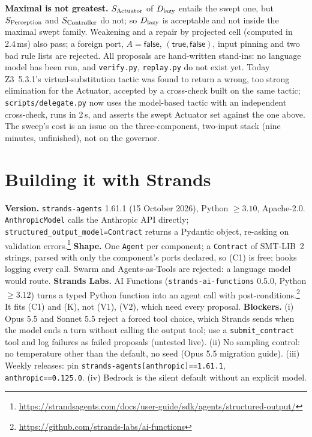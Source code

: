 \documentclass[10pt]{article}
\theoremstyle{tplain}\newtheorem{theorem}{Theorem}\newtheorem{lemma}[theorem]{Lemma}\newtheorem{proposition}[theorem]{Proposition}\newtheorem{corollary}[theorem]{Corollary}\newtheorem{claim}[theorem]{Claim}
\theoremstyle{tdef}\newtheorem{definition}[theorem]{Definition}
\newcommand{\TRUE}{\mathsf{true}}\newcommand{\FALSE}{\mathsf{false}}
\begin{document}
\textbf{Maximal is not greatest.} $S_{\rm Actuator}$ of $D_{\rm lazy}$ entails the swept one, but $S_{\rm Perception}$ and $S_{\rm Controller}$ do not; so $D_{\rm lazy}$ is acceptable and not inside the maximal swept family. Weakening and a repair by projected cell (computed in 2.4\,ms) also pass; a foreign port, $A=\FALSE$, $(\TRUE,\FALSE)$, input pinning and two bad rule lists are rejected. All proposals are hand-written stand-ins: no language model has been run, and \texttt{verify.py}, \texttt{replay.py} do not exist yet. Today Z3~5.3.1's virtual-substitution tactic was found to return a wrong, too strong elimination for the Actuator, accepted by a cross-check built on the same tactic; \texttt{scripts/delegate.py} now uses the model-based tactic with an independent cross-check, runs in 2\,s, and asserts the swept Actuator set against the one above. The sweep's cost is an issue on the three-component, two-input stack (nine minutes, unfinished), not on the governor.

\section{Building it with Strands}
\textbf{Version.} \texttt{strands-agents} 1.61.1 (15 October 2026), Python $\ge3.10$, Apache-2.0. \texttt{AnthropicModel} calls the Anthropic API directly; \texttt{structured\_output\_model=Contract} returns a Pydantic object, re-asking on validation errors.\footnote{\url{https://strandsagents.com/docs/user-guide/sdk/agents/structured-output/}} \textbf{Shape.} One \texttt{Agent} per component; a \texttt{Contract} of SMT-LIB~2 strings, parsed with only the component's ports declared, so (C1) is free; hooks logging every call. Swarm and Agents-as-Tools are rejected: a language model would route. \textbf{Strands Labs.} AI Functions (\texttt{strands-ai-functions} 0.5.0, Python $\ge3.12$) turns a typed Python function into an agent call with post-conditions.\footnote{\url{https://github.com/strands-labs/ai-functions}} It fits (C1) and (K), not (V1), (V2), which need every proposal. \textbf{Blockers.} (i) Opus 5.5 and Sonnet 5.5 reject a forced tool choice, which Strands sends when the model ends a turn without calling the output tool; use a \texttt{submit\_contract} tool and log failures as failed proposals (untested live). (ii) No sampling control: no temperature other than the default, no seed (Opus 5.5 migration guide). (iii) Weekly releases: pin \texttt{strands-agents[anthropic]==1.61.1}, \texttt{anthropic==0.125.0}. (iv) Bedrock is the silent default without an explicit model.
\end{document}
